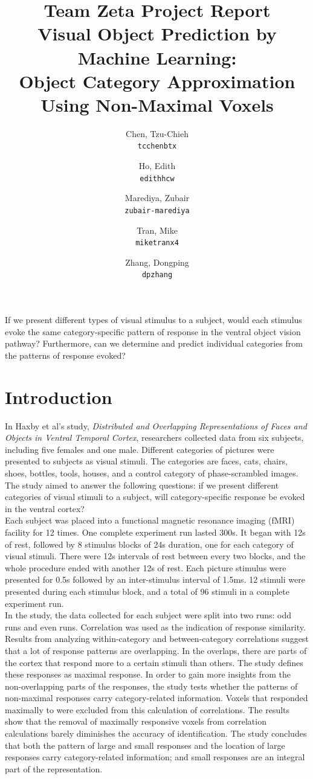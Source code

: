 \documentclass[11pt,twocolumn]{article}
\title{\textbf{Team Zeta Project Report}\\
Visual Object Prediction by Machine Learning:\\ 
Object Category Approximation Using Non-Maximal Voxels}
\author{
  Chen, Tzu-Chieh\\
  \texttt{tcchenbtx}
  \and
  Ho, Edith\\
  \texttt{edithhcw}
  \and
  Marediya, Zubair\\
  \texttt{zubair-marediya}
  \and
  Tran, Mike\\
  \texttt{miketranx4}
  \and
  Zhang, Dongping\\
  \texttt{dpzhang}
}
\begin{document}
\maketitle

\abstract{}
If we present different types of 
visual stimulus to a subject, would each stimulus evoke the 
same category-specific pattern of response in the ventral object vision 
pathway? Furthermore, can we determine and predict individual
categories from the patterns of response evoked? 

\section{Introduction}

In Haxby et al's study, \emph{Distributed and Overlapping Representations of Faces
and Objects in Ventral Temporal Cortex}\cite{objectrec}, researchers collected data 
from six subjects, including five females and one male. 
Different categories of pictures were presented to subjects as visual stimuli.
The categories are faces, cats, chairs, shoes, bottles, tools, houses, 
and a control category of phase-scrambled images.
The study aimed to answer the following questions: if we present 
different categories of visual stimuli to a subject, will category-specific response be 
evoked in the ventral cortex? \\

Each subject was placed into a functional magnetic resonance imaging 
(fMRI) facility for 12 times. One complete experiment run lasted 300s. It began 
with 12s of rest, followed by 8 stimulus blocks of 24s duration, one for 
each category of visual stimuli. There were 12s intervals of rest between 
every two blocks, and the whole procedure ended with another 12s of rest. 
Each picture stimulus were presented for 0.5s followed by an inter-stimulus 
interval of 1.5ms. 12 stimuli were presented during each stimulus 
block, and a total of 96 stimuli in a complete experiment run.\\

In the study, the data collected for each subject were split into two 
runs: odd runs and even runs. Correlation was used as the indication of 
response similarity. Results from analyzing within-category and 
between-category correlations suggest that a lot of response patterns 
are overlapping. In the overlaps, there are parts of the cortex that respond 
more to a certain stimuli than others. The study defines these responses as 
maximal response. In order to gain more insights from the non-overlapping 
parts of the responses, the study tests whether the patterns of non-maximal 
responses carry category-related information. Voxels that responded maximally 
to were excluded from this calculation of correlations. The results show that the 
removal of maximally responsive voxels from correlation calculations 
barely diminishes the accuracy of identification. The study concludes 
that both the pattern of large and small responses and the location 
of large responses carry category-related information; and small responses 
are an integral part of the representation.\\
\end{document}
